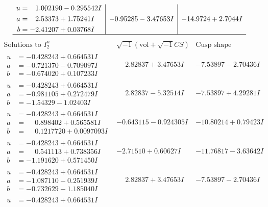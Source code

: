 \documentclass[1p]{elsarticle_modified}
\theoremstyle{definition}
\newcommand{\I}{\sqrt{-1}}
\begin{document}
$$\begin{array}{c|c|c}
\begin{aligned}
u &= \phantom{-}1.002190 - 0.295542 I \\
a &= \phantom{-}2.53373 + 1.75241 I \\
b &= -2.41207 + 0.03768 I\end{aligned}
 & -0.95285 - 3.47653 I & -14.9724 + 2.7044 I\\
 \hline 
 \end{array}$$\newpage$$\begin{array}{c|c|c}  
\text{Solutions to }I^u_{2}& \I (\text{vol} + \sqrt{-1}CS) & \text{Cusp shape}\\
 \hline 
\begin{aligned}
u &= -0.428243 + 0.664531 I \\
a &= -0.721370 - 0.709097 I \\
b &= -0.674020 + 0.107233 I\end{aligned}
 & \phantom{-}2.82837 + 3.47653 I & -7.53897 - 2.70436 I \\ \hline\begin{aligned}
u &= -0.428243 + 0.664531 I \\
a &= -0.981105 + 0.272479 I \\
b &= -1.54329 - 1.02403 I\end{aligned}
 & \phantom{-}2.82837 - 5.32514 I & -7.53897 + 4.29281 I \\ \hline\begin{aligned}
u &= -0.428243 + 0.664531 I \\
a &= \phantom{-}0.898402 + 0.565581 I \\
b &= \phantom{-}0.1217720 + 0.0097093 I\end{aligned}
 & -0.643115 - 0.924305 I & -10.80214 + 0.79423 I \\ \hline\begin{aligned}
u &= -0.428243 + 0.664531 I \\
a &= \phantom{-}0.541113 + 0.738356 I \\
b &= -1.191620 + 0.571450 I\end{aligned}
 & -2.71510 + 0.60627 I & -11.76817 - 3.63642 I \\ \hline\begin{aligned}
u &= -0.428243 + 0.664531 I \\
a &= -1.087110 - 0.251939 I \\
b &= -0.732629 - 1.185040 I\end{aligned}
 & \phantom{-}2.82837 + 3.47653 I & -7.53897 - 2.70436 I \\ \hline\begin{aligned}
u &= -0.428243 + 0.664531 I \\

\end{aligned}
\end{array}$$
\end{document}
